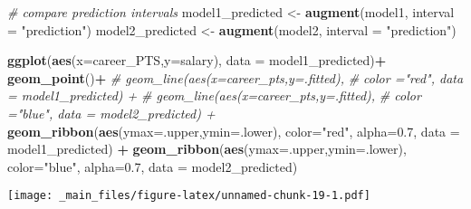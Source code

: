 \documentclass[
]{book}
\newenvironment{Shaded}{\begin{snugshade}}{\end{snugshade}}
\newcommand{\AttributeTok}[1]{\textcolor[rgb]{0.13,0.29,0.53}{#1}}
\newcommand{\CommentTok}[1]{\textcolor[rgb]{0.56,0.35,0.01}{\textit{#1}}}
\newcommand{\FloatTok}[1]{\textcolor[rgb]{0.00,0.00,0.81}{#1}}
\newcommand{\FunctionTok}[1]{\textcolor[rgb]{0.13,0.29,0.53}{\textbf{#1}}}
\newcommand{\NormalTok}[1]{#1}
\newcommand{\OtherTok}[1]{\textcolor[rgb]{0.56,0.35,0.01}{#1}}
\newcommand{\SpecialCharTok}[1]{\textcolor[rgb]{0.81,0.36,0.00}{\textbf{#1}}}
\newcommand{\StringTok}[1]{\textcolor[rgb]{0.31,0.60,0.02}{#1}}
\begin{document}
\begin{Shaded}
\begin{Highlighting}[]
\CommentTok{\# compare prediction intervals}
\NormalTok{model1\_predicted }\OtherTok{\textless{}{-}} \FunctionTok{augment}\NormalTok{(model1, }\AttributeTok{interval =} \StringTok{"prediction"}\NormalTok{)}
\NormalTok{model2\_predicted }\OtherTok{\textless{}{-}} \FunctionTok{augment}\NormalTok{(model2, }\AttributeTok{interval =} \StringTok{"prediction"}\NormalTok{)}

  \FunctionTok{ggplot}\NormalTok{(}\FunctionTok{aes}\NormalTok{(}\AttributeTok{x=}\NormalTok{career\_PTS,}\AttributeTok{y=}\NormalTok{salary), }\AttributeTok{data =}\NormalTok{ model1\_predicted)}\SpecialCharTok{+}
  \FunctionTok{geom\_point}\NormalTok{()}\SpecialCharTok{+}
  \CommentTok{\# geom\_line(aes(x=career\_pts,y=.fitted),}
  \CommentTok{\#           color ="red", data = model1\_predicted) +}
  \CommentTok{\# geom\_line(aes(x=career\_pts,y=.fitted),}
  \CommentTok{\#          color ="blue", data = model2\_predicted) +}
  \FunctionTok{geom\_ribbon}\NormalTok{(}\FunctionTok{aes}\NormalTok{(}\AttributeTok{ymax=}\NormalTok{.upper,}\AttributeTok{ymin=}\NormalTok{.lower),}
              \AttributeTok{color=}\StringTok{"red"}\NormalTok{,}
              \AttributeTok{alpha=}\FloatTok{0.7}\NormalTok{,}
              \AttributeTok{data =}\NormalTok{ model1\_predicted) }\SpecialCharTok{+}
  \FunctionTok{geom\_ribbon}\NormalTok{(}\FunctionTok{aes}\NormalTok{(}\AttributeTok{ymax=}\NormalTok{.upper,}\AttributeTok{ymin=}\NormalTok{.lower),}
              \AttributeTok{color=}\StringTok{"blue"}\NormalTok{,}
              \AttributeTok{alpha=}\FloatTok{0.7}\NormalTok{,}
              \AttributeTok{data =}\NormalTok{ model2\_predicted)}
\end{Highlighting}
\end{Shaded}

\texttt{[image: \_main\_files/figure-latex/unnamed-chunk-19-1.pdf]}

\begin{Shaded}
\end{Shaded}
\end{document}
